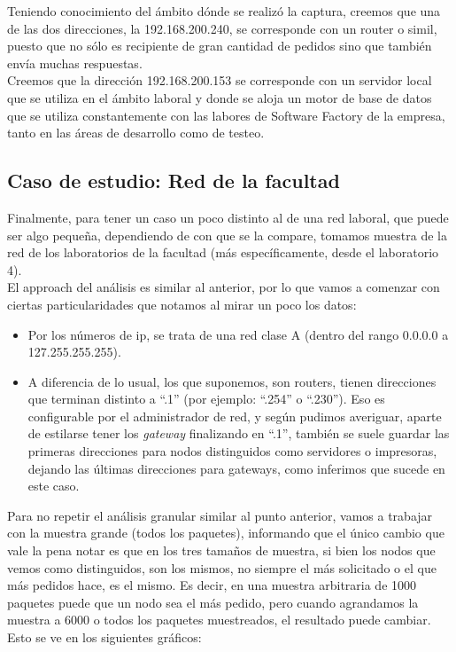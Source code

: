 \indent Teniendo conocimiento del ámbito dónde se realizó la captura, creemos que una de las dos direcciones, la 192.168.200.240, se corresponde con un router o simil, puesto que no sólo es recipiente de gran cantidad de pedidos sino que también envía muchas respuestas.\\
\indent Creemos que la dirección 192.168.200.153 se corresponde con un servidor local que se utiliza en el ámbito laboral y donde se aloja un motor de base de datos que se utiliza constantemente con las labores de Software Factory de la empresa, tanto en las áreas de desarrollo como de testeo.\\

\subsection{Caso de estudio: Red de la facultad}

\indent Finalmente, para tener un caso un poco distinto al de una red laboral, que puede ser algo pequeña, dependiendo de con que se la compare, tomamos muestra de la red de los laboratorios de la facultad (más específicamente, desde el laboratorio 4).\\
\indent El approach del análisis es similar al anterior, por lo que vamos a comenzar con ciertas particularidades que notamos al mirar un poco los datos:
\begin{itemize}
	\item Por los números de ip, se trata de una red clase A (dentro del rango 0.0.0.0 a 127.255.255.255).
	\item A diferencia de lo usual, los que suponemos, son routers, tienen direcciones que terminan distinto a ``.1'' (por ejemplo: ``.254'' o ``.230''). Eso es configurable por el administrador de red, y según pudimos averiguar, aparte de estilarse tener los \textit{gateway} finalizando en ``.1'', también se suele guardar las primeras direcciones para nodos distinguidos como servidores o impresoras, dejando las últimas direcciones para gateways, como inferimos que sucede en este caso.
\end{itemize}
\indent Para no repetir el análisis granular similar al punto anterior, vamos a trabajar con la muestra grande (todos los paquetes), informando que el único cambio que vale la pena notar es que en los tres tamaños de muestra, si bien los nodos que vemos como distinguidos, son los mismos, no siempre el más solicitado o el que más pedidos hace, es el mismo. Es decir, en una muestra arbitraria de 1000 paquetes puede que un nodo sea el más pedido, pero cuando agrandamos la muestra a 6000 o todos los paquetes muestreados, el resultado puede cambiar. Esto se ve en los siguientes gráficos:

